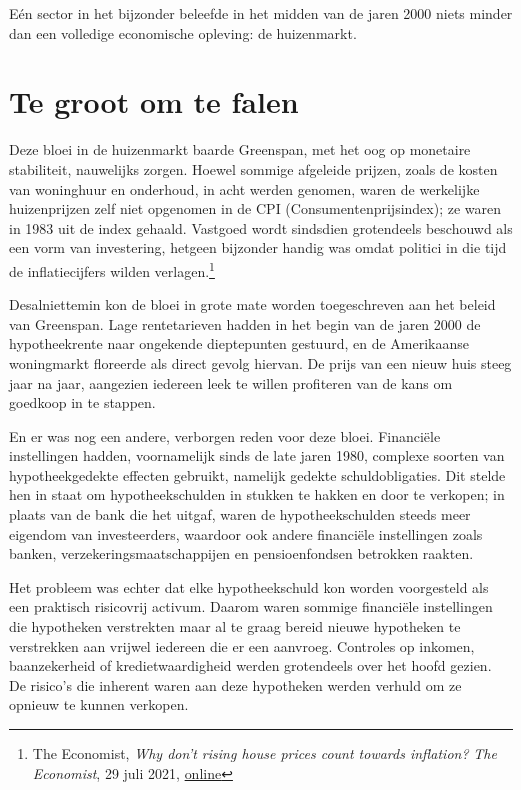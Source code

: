 \documentclass[
  a5paper,
  smalldemyvopaper,11pt,twoside,onecolumn,openright,extrafontsizes,
hidelinks]{memoir}
\begin{document}
Eén sector in het bijzonder beleefde in het midden van de jaren 2000
niets minder dan een volledige economische opleving: de huizenmarkt.

\section{Te groot om te falen}\label{te-groot-om-te-falen}

Deze bloei in de huizenmarkt baarde Greenspan, met het oog op monetaire
stabiliteit, nauwelijks zorgen. Hoewel sommige afgeleide prijzen, zoals
de kosten van woninghuur en onderhoud, in acht werden genomen, waren de
werkelijke huizenprijzen zelf niet opgenomen in de CPI
(Consumentenprijsindex); ze waren in 1983 uit de index gehaald. Vastgoed
wordt sindsdien grotendeels beschouwd als een vorm van investering,
hetgeen bijzonder handig was omdat politici in die tijd de
inflatiecijfers wilden verlagen.\footnote{The Economist, \emph{Why don't
  rising house prices count towards inflation?} \emph{The Economist}, 29
  juli 2021,
  \href{https://www.economist.com/the-economist-explains/2021/07/29/why-dont-rising-house-prices-count-towards-inflation}{online}}

Desalniettemin kon de bloei in grote mate worden toegeschreven aan het
beleid van Greenspan. Lage rentetarieven hadden in het begin van de
jaren 2000 de hypotheekrente naar ongekende dieptepunten gestuurd, en de
Amerikaanse woningmarkt floreerde als direct gevolg hiervan. De prijs
van een nieuw huis steeg jaar na jaar, aangezien iedereen leek te willen
profiteren van de kans om goedkoop in te stappen.

En er was nog een andere, verborgen reden voor deze bloei. Financiële
instellingen hadden, voornamelijk sinds de late jaren 1980, complexe
soorten van hypotheekgedekte effecten gebruikt, namelijk gedekte
schuldobligaties. Dit stelde hen in staat om hypotheekschulden in
stukken te hakken en door te verkopen; in plaats van de bank die het
uitgaf, waren de hypotheekschulden steeds meer eigendom van
investeerders, waardoor ook andere financiële instellingen zoals banken,
verzekeringsmaatschappijen en pensioenfondsen betrokken raakten.

Het probleem was echter dat elke hypotheekschuld kon worden voorgesteld
als een praktisch risicovrij activum. Daarom waren sommige financiële
instellingen die hypotheken verstrekten maar al te graag bereid nieuwe
hypotheken te verstrekken aan vrijwel iedereen die er een aanvroeg.
Controles op inkomen, baanzekerheid of kredietwaardigheid werden
grotendeels over het hoofd gezien. De risico's die inherent waren aan
deze hypotheken werden verhuld om ze opnieuw te kunnen verkopen.
\end{document}
